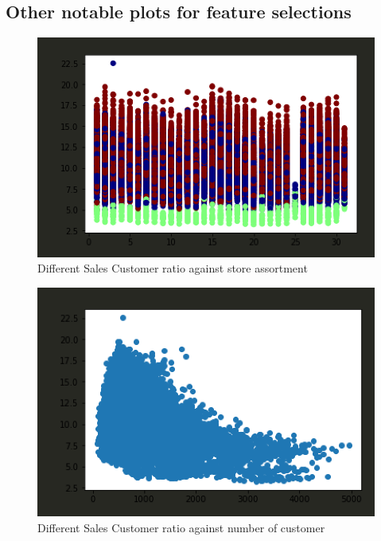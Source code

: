 \documentclass{article}
\begin{document}
\subsection{Other notable plots for feature selections}
\begin{figure}[h]
	\centering
	\includegraphics[scale=0.3]{Features/assortment.png}
	\caption{Different Sales Customer ratio against store assortment}
\end{figure}
\begin{figure}[h]
	\centering
	\includegraphics[scale=0.3]{Features/customers.png}
	\caption{Different Sales Customer ratio against number of customer}
\end{figure}
\end{document}
